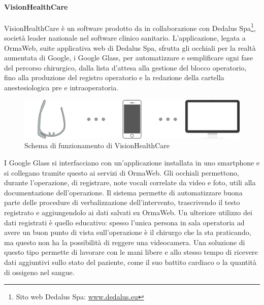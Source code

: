    \paragraph{VisionHealthCare}
   VisionHealthCare è un software prodotto da \nomeAzienda{} in collaborazione con Dedalus Spa\footnote{Sito web Dedalus Spa: \href{www.dedalus.eu}{www.dedalus.eu}}, società leader nazionale nel software clinico sanitario. L'applicazione, legata a OrmaWeb, suite applicativa web di Dedalus Spa, sfrutta gli occhiali per la realtà aumentata di Google, i Google Glass, per automatizzare e semplificare ogni fase del percorso chirurgico, dalla lista d'attesa alla gestione del blocco operatorio, fino alla produzione del registro operatorio e la redazione della cartella anestesiologica pre e intraoperatoria.
   \begin{figure}[H]
      \begin{center}
         \includegraphics[width=15cm,keepaspectratio]{immagini/visionhealthcare-schema}
      \end{center}
      \caption{Schema di funzionamento di VisionHealthCare}\label{schemavisionhealthcare}
   \end{figure}
   I Google Glass si interfacciano con un'applicazione installata in uno smartphone e si collegano tramite questo ai servizi di OrmaWeb.
   Gli occhiali permettono, durante l'operazione, di registrare, note vocali correlate da video e foto, utili alla documentazione dell'operazione. Il sistema permette di automatizzare buona parte delle procedure di verbalizzazione dell'intervento, trascrivendo il testo registrato e aggiungendolo ai dati salvati su OrmaWeb. Un ulteriore utilizzo dei dati registrati è quello educativo: spesso l'unica persona in sala operatoria ad avere un buon punto di vista sull'operazione è il chirurgo che la sta praticando, ma questo non ha la possibilità di reggere una videocamera. Una soluzione di questo tipo permette di lavorare con le mani libere e allo stesso tempo di ricevere dati aggiuntivi sullo stato del paziente, come il suo battito cardiaco o la quantità di ossigeno nel sangue.

